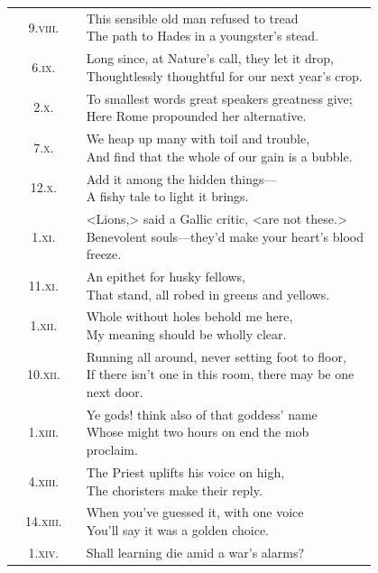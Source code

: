 \begin{longtable} {c p{0.8\linewidth}} 
9.\textsc{viii.} &  \makecell[l]{This sensible old man refused to tread\\
The path to Hades in a youngster's stead.}\\
6.\textsc{ix.} &  \makecell[l]{Long since, at Nature's call, they let it drop,\\
Thoughtlessly thoughtful for our next year's crop.}\\
2.\textsc{x.} &  \makecell[l]{To smallest words great speakers greatness give;\\
Here Rome propounded her alternative.}\\
7.\textsc{x.} &  \makecell[l]{We heap up many with toil and trouble,\\
And find that the whole of our gain is a bubble.}\\
12.\textsc{x.} &  \makecell[l]{Add it among the hidden things—\\
A fishy tale to light it brings.}\\
1.\textsc{xi.} &  \makecell[l]{<Lions,> said a Gallic critic, <are not these.>\\
Benevolent souls—they'd make your heart's blood freeze.}\\
11.\textsc{xi.} &  \makecell[l]{An epithet for husky fellows,\\
That stand, all robed in greens and yellows.}\\
1.\textsc{xii.} &  \makecell[l]{Whole without holes behold me here,\\
My meaning should be wholly clear.}\\
10.\textsc{xii.} &  \makecell[l]{Running all around, never setting foot to floor,\\
If there isn't one in this room, there may be one next door.}\\
1.\textsc{xiii.} &  \makecell[l]{Ye gods! think also of that goddess' name\\
Whose might two hours on end the mob proclaim.}\\
4.\textsc{xiii.} &  \makecell[l]{The Priest uplifts his voice on high,\\
The choristers make their reply.}\\
14.\textsc{xiii.} &  \makecell[l]{When you've guessed it, with one voice\\
You'll say it was a golden choice.}\\
1.\textsc{xiv.} &  \makecell[l]{Shall learning die amid a war's alarms?\\
}
\end{longtable}
